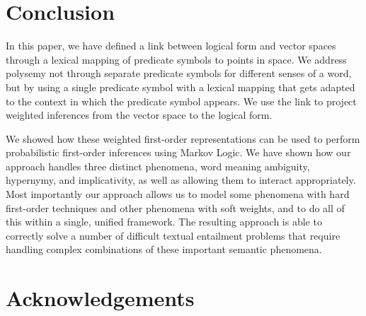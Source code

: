 \section{Conclusion}

In this paper, we have defined a link between logical form and vector
spaces through a lexical mapping of predicate symbols to points in
space. We address polysemy not through separate predicate symbols for
different senses of a word, but by using a single predicate symbol
with a lexical mapping that gets
adapted to the context in which the predicate symbol appears. We use
the link to project weighted inferences from the vector space to the
logical form. 

We showed how these weighted first-order
representations can be used to perform probabilistic first-order inferences
using Markov Logic.  We have shown how our approach handles three distinct
phenomena, word meaning ambiguity, hypernymy, and implicativity, as well as
allowing them to interact appropriately.  Most importantly our approach allows 
us to model some phenomena with hard first-order techniques and
other phenomena with soft weights, and to do all of this within a
single, unified framework.
The resulting approach is able to correctly solve a number of difficult
textual entailment problems that require handling complex combinations of these
important semantic phenomena.




\section*{Acknowledgements}


